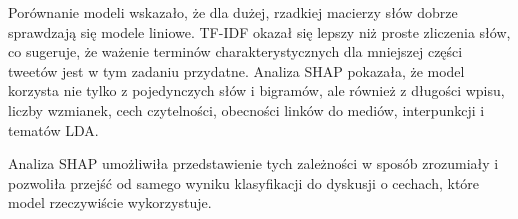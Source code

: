 \documentclass[12pt, a4paper, oneside]{scrreprt}
\begin{document}
Porównanie modeli wskazało, że dla dużej, rzadkiej macierzy słów dobrze sprawdzają
się modele liniowe. TF-IDF okazał się lepszy niż proste zliczenia słów, co sugeruje,
że ważenie terminów charakterystycznych dla mniejszej części tweetów jest w
tym zadaniu przydatne. Analiza SHAP pokazała, że model korzysta nie tylko
z pojedynczych słów i bigramów, ale również z długości wpisu, liczby wzmianek,
cech czytelności, obecności linków do mediów, interpunkcji i tematów LDA.

Analiza SHAP umożliwiła przedstawienie tych zależności w sposób zrozumiały
i pozwoliła przejść od samego wyniku klasyfikacji do dyskusji o cechach,
które model rzeczywiście wykorzystuje.

\FloatBarrier
\printbibliography[title={Bibliografia}]
\end{document}
